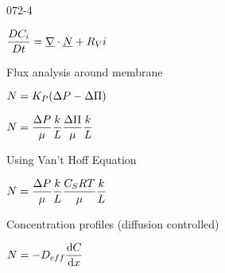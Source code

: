 \begin{mitframe}{072-4}
\begin{listone}
	\item $\dfrac{\elecdisplace\conc_{\state}}{\elecdisplace{t}}=\gradop\cdot\uline{\nummoles}+\specsource{i}$
    \item Flux analysis around membrane
    	\begin{listtwo}
        	\item $\nummoles=\dilfac_{\p}(\iipf\p-\iipf\Pi)$
            \item $\nummoles=\dfrac{\iipf\p}{\chempot}\dfrac{\thermcond}{\length}\dfrac{\iipf\Pi}{\chempot}\dfrac{\thermcond}{\length}$
        \end{listtwo}
\item Using Van't Hoff Equation
	\begin{listtwo}
    	\item $\nummoles=\dfrac{\iipf\p}{\chempot}\dfrac{\thermcond}{\length}\dfrac{\conc_{\entropy}\gasconst\Temp}{\chempot}\dfrac{\thermcond}{\length}$
    \end{listtwo}
\item Concentration profiles (diffusion controlled)
		\begin{listtwo}
        	\item$\nummoles=-\elecdisplace_{eff}\dfrac{\mathrm{d}\conc}{\mathrm{d}\disp}$
            
        \end{listtwo}
\end{listone}
\end{mitframe}